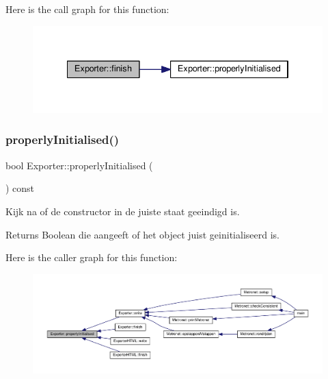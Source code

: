 Here is the call graph for this function\+:\nopagebreak
\begin{figure}[H]
\begin{center}
\leavevmode
\includegraphics[width=334pt]{class_exporter_ae477714f462d70cfc5b3970f91fcc4ed_cgraph}
\end{center}
\end{figure}
\mbox{\label{class_exporter_aafd9df9210aeefd7bb7fd434fc317cf0}} 
\subsubsection{\texorpdfstring{properly\+Initialised()}{properlyInitialised()}}
{\footnotesize\ttfamily bool Exporter\+::properly\+Initialised (\begin{DoxyParamCaption}{ }\end{DoxyParamCaption}) const\hspace{0.3cm}{\ttfamily [virtual]}}



Kijk na of de constructor in de juiste staat geeindigd is. 

\begin{DoxyReturn}{Returns}
Boolean die aangeeft of het object juist geinitialiseerd is. 
\end{DoxyReturn}
Here is the caller graph for this function\+:\nopagebreak
\begin{figure}[H]
\begin{center}
\leavevmode
\includegraphics[width=350pt]{class_exporter_aafd9df9210aeefd7bb7fd434fc317cf0_icgraph}
\end{center}
\end{figure}
\mbox{\label{class_exporter_ab3736803133eb727cf87a7306f91eb11}} 

